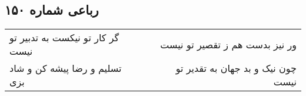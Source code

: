 \begin{center}
\section*{رباعی شماره ۱۵۰}
\label{sec:sh150}
\begin{longtable}{l p{0.5cm} r}
گر کار تو نیکست به تدبیر تو نیست
&&
ور نیز بدست هم ز تقصیر تو نیست
\\
تسلیم و رضا پیشه کن و شاد بزی
&&
چون نیک و بد جهان به تقدیر تو نیست
\\
\end{longtable}
\end{center}
